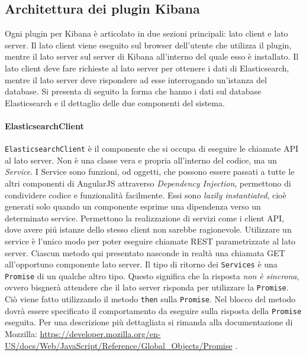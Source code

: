 \subsection{Architettura dei plugin Kibana}
\label{sec:architettura}
Ogni plugin per Kibana è articolato in due sezioni principali: lato client e lato server. Il lato client viene eseguito sul browser dell'utente che utilizza il plugin, mentre il lato server sul server di Kibana all'interno del quale esso è installato. Il lato client deve fare richieste al lato server per ottenere i dati di Elasticsearch, mentre il lato server deve rispondere ad esse interrogando un'istanza del database. Si presenta di seguito la forma che hanno i dati sul database Elasticsearch e il dettaglio delle due componenti del sistema.

\paragraph{ElasticsearchClient} \Spazio
\texttt{ElasticsearchClient} è il componente che si occupa di eseguire le chiamate API al lato server. Non è una classe vera e propria all'interno del codice, ma un \emph{Service}. 
I Service sono funzioni, od oggetti, che possono essere passati a tutte le altri componenti di AngularJS attraverso \emph{Dependency Injection}, permettono di condividere codice e funzionalità facilmente. Essi sono \emph{lazily instantiated}, cioè generati solo quando un componente esprime una dipendenza verso un determinato service. Permettono la realizzazione di servizi come i client API, dove avere piú istanze dello stesso client non sarebbe ragionevole. 
Utilizzare un service è l'unico modo per poter eseguire chiamate REST parametrizzate al lato server. Ciascun metodo qui presentato nasconde in realtà una chiamata GET all'opportuno componente lato server. 
Il tipo di ritorno dei \texttt{Services} è una \texttt{Promise} di un qualche altro tipo. Questo significa che la risposta \emph{non è sincrona}, ovvero bisgnerà attendere che il lato server risponda per utilizzare la \texttt{Promise}. Ciò viene fatto utilizzando il metodo \texttt{then} sulla \texttt{Promise}. Nel blocco del metodo dovrà essere specificato il comportamento da eseguire sulla risposta della \texttt{Promise} eseguita. Per una descrizione più dettagliata si rimanda alla documentazione di Mozzilla: \href{https://developer.mozilla.org/en-US/docs/Web/JavaScript/Reference/Global\_Objects/Promise}{https://developer.mozilla.org/en-US/docs/Web/JavaScript/Reference/Global\_Objects/Promise} .


